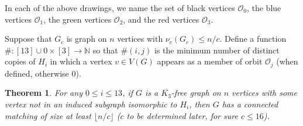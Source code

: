 \documentclass[12 pt]{article}
\newtheorem{theorem}{Theorem}
\newcommand{\kfree}{$\overline{K_3}$-free\xspace}
\begin{document}


In each of the above drawings, we name the set of black vertices $\mathcal{O}_0$, the blue vertices  $\mathcal{O}_1$, the green vertices $\mathcal{O}_2$, and the red vertices $\mathcal{O}_3$.

Suppose that $G_c$ is graph on $n$ vertices with $\nu_c(G_c) \leq n/c$.  Define a function $\# : [13] \cup {0} \times [3] \rightarrow \mathbb{N}$ so that $\#(i,j)$ is  the minimum number of distinct copies of $H_i$ in which a vertex $v \in V(G)$ appears as a member of orbit $\mathcal{O}_j$ (when defined, otherwise 0). 

\begin{theorem}
	For any $0 \leq i \leq 13$, if $G$ is a  \kfree graph on $n$ vertices with some vertex not in an induced subgraph isomorphic to $H_i$, then $G$ has a connected matching of size at least $\lfloor n/c \rfloor$ ($c$ to be determined later, for sure $c\leq 16$).
\end{theorem}
\end{document}
